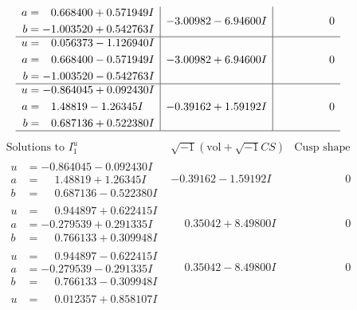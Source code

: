 \documentclass[1p]{elsarticle_modified}
\theoremstyle{definition}
\newcommand{\I}{\sqrt{-1}}
\begin{document}
$$\begin{array}{c|c|c}
\begin{aligned}
a &= \phantom{-}0.668400 + 0.571949 I \\
b &= -1.003520 + 0.542763 I\end{aligned}
 & -3.00982 - 6.94600 I & \phantom{-0.000000 } 0 \\ \hline\begin{aligned}
u &= \phantom{-}0.056373 - 1.126940 I \\
a &= \phantom{-}0.668400 - 0.571949 I \\
b &= -1.003520 - 0.542763 I\end{aligned}
 & -3.00982 + 6.94600 I & \phantom{-0.000000 } 0 \\ \hline\begin{aligned}
u &= -0.864045 + 0.092430 I \\
a &= \phantom{-}1.48819 - 1.26345 I \\
b &= \phantom{-}0.687136 + 0.522380 I\end{aligned}
 & -0.39162 + 1.59192 I & \phantom{-0.000000 } 0\\
 \hline 
 \end{array}$$\newpage$$\begin{array}{c|c|c}  
\text{Solutions to }I^u_{1}& \I (\text{vol} + \sqrt{-1}CS) & \text{Cusp shape}\\
 \hline 
\begin{aligned}
u &= -0.864045 - 0.092430 I \\
a &= \phantom{-}1.48819 + 1.26345 I \\
b &= \phantom{-}0.687136 - 0.522380 I\end{aligned}
 & -0.39162 - 1.59192 I & \phantom{-0.000000 } 0 \\ \hline\begin{aligned}
u &= \phantom{-}0.944897 + 0.622415 I \\
a &= -0.279539 + 0.291335 I \\
b &= \phantom{-}0.766133 + 0.309948 I\end{aligned}
 & \phantom{-}0.35042 + 8.49800 I & \phantom{-0.000000 } 0 \\ \hline\begin{aligned}
u &= \phantom{-}0.944897 - 0.622415 I \\
a &= -0.279539 - 0.291335 I \\
b &= \phantom{-}0.766133 - 0.309948 I\end{aligned}
 & \phantom{-}0.35042 - 8.49800 I & \phantom{-0.000000 } 0 \\ \hline\begin{aligned}
u &= \phantom{-}0.012357 + 0.858107 I \\

\end{aligned}
\end{array}$$
\end{document}

